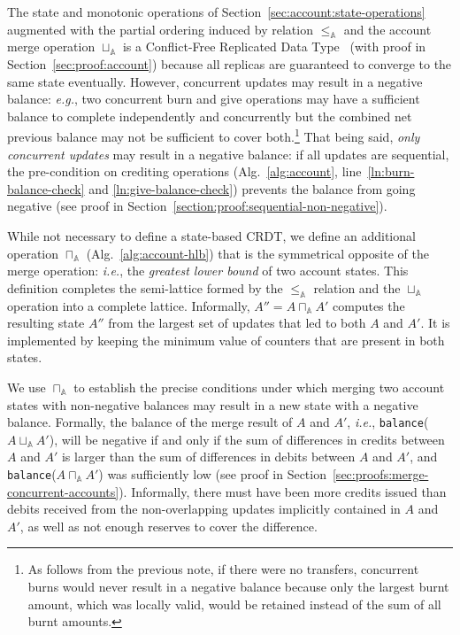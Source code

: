 \documentclass[9pt]{article}   	%
\begin{document}
The state and monotonic operations  of Section~\ref{sec:account:state-operations} augmented with the partial ordering induced by relation $\leq_\mathds{A}$ and the account merge operation $\sqcup_\mathds{A}$ is a Conflict-Free Replicated Data Type~\cite{shapiro:hal-00932836} (with proof in Section~\ref{sec:proof:account}) because all replicas are guaranteed to converge to the same state eventually. However, concurrent updates may result in a negative balance: \textit{e.g.}, two concurrent burn and give operations may have a sufficient balance to complete independently and concurrently but the combined net previous balance may not be sufficient to cover both.\footnote{As follows from the previous note, if there were no transfers, concurrent burns would never result in a negative balance because only the largest burnt amount, which was locally valid, would be retained instead of the sum of all burnt amounts.} That being said, \textit{only concurrent updates} may result in a negative balance: if all updates are sequential, the pre-condition on crediting operations (Alg.~\ref{alg:account}, line~\ref{ln:burn-balance-check} and \ref{ln:give-balance-check}) prevents the balance from going negative (see proof in Section~\ref{section:proof:sequential-non-negative}).

While not necessary to define a state-based CRDT, we define an additional operation $\sqcap_\mathds{A}$ (Alg.~\ref{alg:account-hlb}) that is the symmetrical opposite of the merge operation: \textit{i.e.}, the \textit{greatest lower bound} of two account states. This definition completes the semi-lattice formed by the $\leq_\mathds{A}$ relation and the $\sqcup_\mathds{A}$ operation into a complete lattice. Informally, $A'' = A \sqcap_\mathds{A} A'$ computes the resulting state $A''$ from the largest set of updates that led to both $A$ and $A'$. It is implemented by keeping the minimum value of counters that are present in both states.

We use $\sqcap_\mathds{A}$ to establish the precise conditions under which merging two account states with non-negative balances may result in a new state with a negative balance. Formally, the balance of the merge result of $A$ and $A'$, \textit{i.e.}, \texttt{balance}($A \sqcup_\mathds{A} A'$), will be negative if and only if the sum of differences in credits between $A$ and $A'$ is larger than the sum of differences in debits between $A$ and $A'$, and \texttt{balance}($A \sqcap_\mathds{A} A'$) was sufficiently low (see proof in Section~\ref{sec:proofs:merge-concurrent-accounts}). Informally, there must have been more credits issued than debits received from the non-overlapping updates implicitly contained in $A$ and $A'$, as well as not enough reserves to cover the difference.
\end{document}
